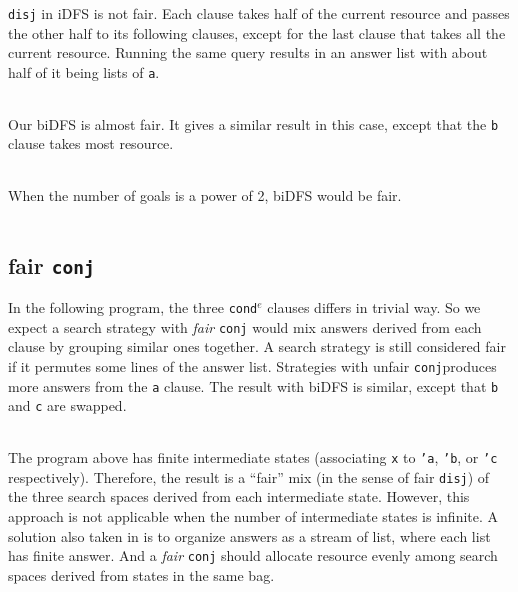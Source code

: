 \documentclass[format=acmlarge, review=true, authordraft=true]{acmart}
\newcommand{\conde}{\texttt{cond$^e$} }
\newcommand{\conj}{\texttt{conj}}
\begin{document}
\texttt{disj} in iDFS is not fair. Each clause takes half of the current resource and passes the other half to its following clauses, except for the last clause that takes all the current resource. Running the same query results in an answer list with about half of it being lists of \texttt{a}.

\begin{center}
	\begin{tabular}{c}
		
	\end{tabular}
\end{center}

Our biDFS is almost fair. It gives a similar result in this case, except that the \texttt{b} clause takes most resource. 

\begin{center}
	\begin{tabular}{c}
		
	\end{tabular}
\end{center}

When the number of goals is a power of 2, biDFS would be fair. 

\begin{center}
	\begin{tabular}{c}
		
	\end{tabular}
\end{center}


\subsection{fair \texttt{conj}}

In the following program, the three \conde clauses differs in trivial way. So we expect a search strategy with \emph{fair} \texttt{conj} would mix answers derived from each clause by grouping similar ones together. A search strategy is still considered fair if it permutes some lines of the answer list. Strategies with unfair \conj produces more answers from the \texttt{a} clause. The result with biDFS is similar, except that \texttt{b} and \texttt{c} are swapped.

\begin{center}
	\begin{tabular}{c}
		
	\end{tabular}
\end{center}

The program above has finite intermediate states (associating \texttt{x} to \texttt{'a}, \texttt{'b}, or \texttt{'c} respectively). Therefore, the result is a ``fair'' mix (in the sense of fair \texttt{disj}) of the three search spaces derived from each intermediate state. However, this approach is not applicable when the number of intermediate states is infinite. A solution also taken in \citep{seres1999algebra} is to organize answers as a stream of list, where each list has finite answer. And a \emph{fair} \texttt{conj} should allocate resource evenly among search spaces derived from states in the same bag. 
\end{document}
